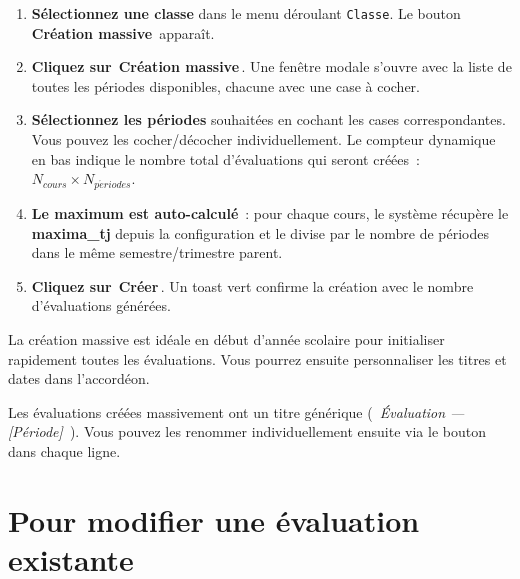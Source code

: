 \documentclass[12pt,a4paper]{report}
\newcommand{\champ}[1]{\texttt{\color{violet}#1}}
\newcommand{\bouton}[1]{{\colorbox{emerald}{\small\sffamily\bfseries\color{white}\,#1\,}}}
\newcommand{\btnamber}[1]{{\colorbox{amber}{\small\sffamily\bfseries\color{white}\,#1\,}}}
\begin{document}
\begin{etape}[title=Proc\'edure : Cr\'eation massive d'\'evaluations]
\begin{enumerate}[leftmargin=1.5cm,label=\textbf{\arabic*.},itemsep=12pt]
  \item \textbf{S\'electionnez une classe} dans le menu d\'eroulant \champ{Classe}. Le bouton \btnamber{Cr\'eation massive} appara\^it.

  \item \textbf{Cliquez sur} \btnamber{Cr\'eation massive}. Une fen\^etre modale s'ouvre avec la liste de toutes les p\'eriodes disponibles, chacune avec une case \`a cocher.

  \item \textbf{S\'electionnez les p\'eriodes} souhait\'ees en cochant les cases correspondantes. Vous pouvez les cocher/d\'ecocher individuellement. Le compteur dynamique en bas indique le nombre total d'\'evaluations qui seront cr\'e\'ees~: $N_{cours} \times N_{p\acute{e}riodes}$.

  \item \textbf{Le maximum est auto-calcul\'e}~: pour chaque cours, le syst\`eme r\'ecup\`ere le \textbf{maxima\_tj} depuis la configuration et le divise par le nombre de p\'eriodes dans le m\^eme semestre/trimestre parent.

  \item \textbf{Cliquez sur} \bouton{Cr\'eer}. Un toast vert confirme la cr\'eation avec le nombre d'\'evaluations g\'en\'er\'ees.
\end{enumerate}
\end{etape}

\begin{astuce}
La cr\'eation massive est id\'eale en d\'ebut d'ann\'ee scolaire pour initialiser rapidement toutes les \'evaluations. Vous pourrez ensuite personnaliser les titres et dates dans l'accord\'eon.
\end{astuce}

\begin{attention}
Les \'evaluations cr\'e\'ees massivement ont un titre g\'en\'erique (\textit{\guillemotleft~\'Evaluation --- [P\'eriode]~\guillemotright}). Vous pouvez les renommer individuellement ensuite via le bouton \textcolor{indigo}{\faPen} dans chaque ligne.
\end{attention}

\section{Pour modifier une \'evaluation existante}
\end{document}
